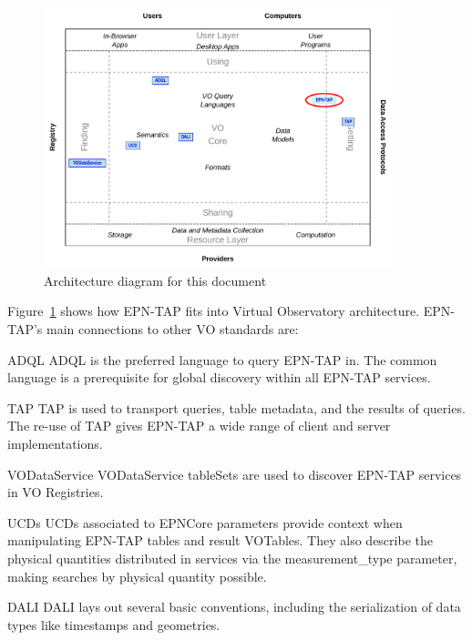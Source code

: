 \documentclass[11pt,a4paper]{ivoa}
\begin{document}
\begin{figure}[thb]
\centering

\includegraphics[width=0.9\textwidth]{role_diagram.pdf}
\caption{Architecture diagram for this document}
\label{fig:archdiag}
\end{figure}

Figure~\ref{fig:archdiag} shows how EPN-TAP fits into Virtual
Observatory architecture.  EPN-TAP's main connections to other VO
standards are:

\begin{bigdescription}
\item[ADQL \citep{2008ivoa.spec.1030O}] ADQL is the preferred language to
query EPN-TAP in.  The common language is a prerequisite for global
discovery within all EPN-TAP services.
\item[TAP \citep{2019ivoa.spec.0927D}] TAP is used to transport queries,
table metadata, and the results of queries.  The re-use of TAP gives
EPN-TAP a wide range of client and server implementations.
\item[VODataService \citep{2021ivoa.spec.1102D}] VODataService tableSets
are used to discover EPN-TAP services in VO Registries.
\item[UCDs \citep{2021ivoa.spec.0616C}] UCDs associated to EPNCore
parameters provide context when manipulating EPN-TAP tables and result
VOTables. They also describe the physical quantities distributed in
services via the measurement\_type parameter, making searches by physical
quantity possible.
\item[DALI \citep{2017ivoa.spec.0517D}] DALI lays out several basic
conventions, including the serialization of data types like timestamps
and geometries.
\end{bigdescription}
\end{document}
